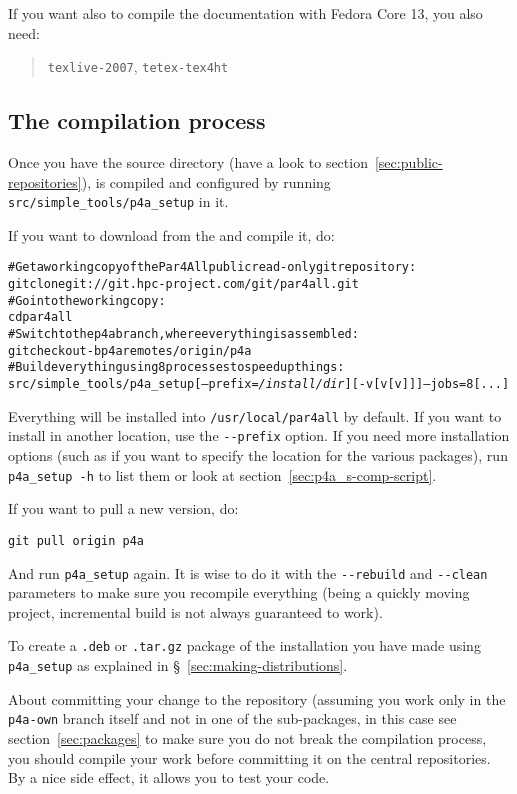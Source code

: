 \documentclass[a4paper]{article}
\begin{document}
If you want also to compile the documentation with Fedora Core 13, you 
also need:
\begin{quote}
  \texttt{texlive-2007}, \texttt{tetex-tex4ht}
\end{quote}

\subsection{The compilation process}
\label{sec:compilation-process}

Once you have the \Apfa source directory (have a look to
section~\ref{sec:public-repositories}), \Apfa is compiled and configured
by running \verb|src/simple_tools/p4a_setup| in it.

If you want to download \Apfa from the \Agit and compile it, do:
\begin{alltt}
# Get a working copy of the Par4All public read-only git repository:
git clone git://git.hpc-project.com/git/par4all.git
# Go into the working copy:
cd par4all
# Switch to the p4a branch, where everything is assembled:
git checkout -b p4a remotes/origin/p4a
# Build everything using 8 processes to speed up things:
src/simple_tools/p4a_setup [--prefix=\emph{/install/dir}] [-v[v[v]]] --jobs=8 [...]
\end{alltt}%
Everything will be installed into \verb|/usr/local/par4all| by default.
If you want to install in another location, use the \verb|--prefix|
option.  If you need more installation options (such as if you want to
specify the location for the various packages), run \verb|p4a_setup -h| to
list them or look at section~\ref{sec:p4a_s-comp-script}.

If you want to pull a new version, do:
\begin{verbatim}
git pull origin p4a
\end{verbatim}

And run \verb|p4a_setup| again. It is wise to do it with the
\verb|--rebuild| and \verb|--clean| parameters to make sure you recompile
everything (\Apips being a quickly moving project, incremental build is
not always guaranteed to work).

To create a \texttt{.deb} or \texttt{.tar.gz} package of the installation
you have made using \verb|p4a_setup| as explained in
\S~\ref{sec:making-distributions}.

About committing your change to the \Agit repository (assuming you work
only in the \texttt{p4a-own} branch itself and not in one of the \Apfa
sub-packages, in this case see section~\ref{sec:packages} to make sure you
do not break the compilation process, you should compile your work before
committing it on the central repositories. By a nice side effect, it
allows you to test your code. \smiley
\end{document}
